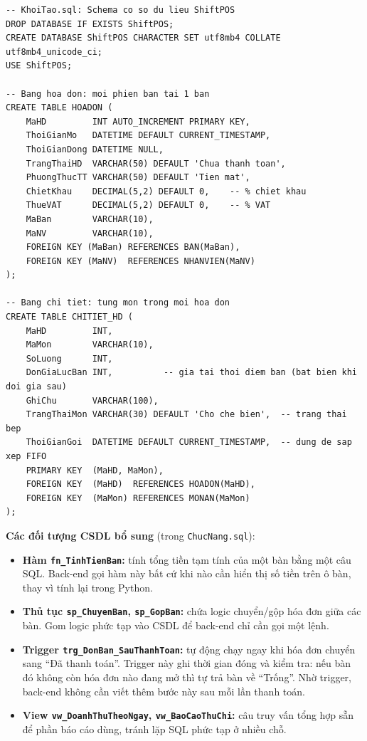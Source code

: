 \documentclass[12pt,a4paper]{report}
\newcommand{\code}[1]{\texttt{#1}}
\begin{document}
\begin{lstlisting}[style=mysql,
  caption={File \texttt{KhoiTao.sql} -- Định nghĩa bảng \texttt{HOADON} và \texttt{CHITIET\_HD}},
  label=lst:sql-tables]
-- KhoiTao.sql: Schema co so du lieu ShiftPOS
DROP DATABASE IF EXISTS ShiftPOS;
CREATE DATABASE ShiftPOS CHARACTER SET utf8mb4 COLLATE utf8mb4_unicode_ci;
USE ShiftPOS;

-- Bang hoa don: moi phien ban tai 1 ban
CREATE TABLE HOADON (
    MaHD         INT AUTO_INCREMENT PRIMARY KEY,
    ThoiGianMo   DATETIME DEFAULT CURRENT_TIMESTAMP,
    ThoiGianDong DATETIME NULL,
    TrangThaiHD  VARCHAR(50) DEFAULT 'Chua thanh toan',
    PhuongThucTT VARCHAR(50) DEFAULT 'Tien mat',
    ChietKhau    DECIMAL(5,2) DEFAULT 0,    -- % chiet khau
    ThueVAT      DECIMAL(5,2) DEFAULT 0,    -- % VAT
    MaBan        VARCHAR(10),
    MaNV         VARCHAR(10),
    FOREIGN KEY (MaBan) REFERENCES BAN(MaBan),
    FOREIGN KEY (MaNV)  REFERENCES NHANVIEN(MaNV)
);

-- Bang chi tiet: tung mon trong moi hoa don
CREATE TABLE CHITIET_HD (
    MaHD         INT,
    MaMon        VARCHAR(10),
    SoLuong      INT,
    DonGiaLucBan INT,          -- gia tai thoi diem ban (bat bien khi doi gia sau)
    GhiChu       VARCHAR(100),
    TrangThaiMon VARCHAR(30) DEFAULT 'Cho che bien',  -- trang thai bep
    ThoiGianGoi  DATETIME DEFAULT CURRENT_TIMESTAMP,  -- dung de sap xep FIFO
    PRIMARY KEY  (MaHD, MaMon),
    FOREIGN KEY  (MaHD)  REFERENCES HOADON(MaHD),
    FOREIGN KEY  (MaMon) REFERENCES MONAN(MaMon)
);
\end{lstlisting}

\textbf{Các đối tượng CSDL bổ sung} (trong \code{ChucNang.sql}):
\begin{itemize}
  \item \textbf{Hàm \code{fn\_TinhTienBan}:} tính tổng tiền tạm tính của một bàn bằng một câu SQL. Back-end gọi hàm này bất cứ khi nào cần hiển thị số tiền trên ô bàn, thay vì tính lại trong Python.
  \item \textbf{Thủ tục \code{sp\_ChuyenBan}, \code{sp\_GopBan}:} chứa logic chuyển/gộp hóa đơn giữa các bàn. Gom logic phức tạp vào CSDL để back-end chỉ cần gọi một lệnh.
  \item \textbf{Trigger \code{trg\_DonBan\_SauThanhToan}:} tự động chạy ngay khi hóa đơn chuyển sang ``Đã thanh toán''. Trigger này ghi thời gian đóng và kiểm tra: nếu bàn đó không còn hóa đơn nào đang mở thì tự trả bàn về ``Trống''. Nhờ trigger, back-end không cần viết thêm bước này sau mỗi lần thanh toán.
  \item \textbf{View \code{vw\_DoanhThuTheoNgay}, \code{vw\_BaoCaoThuChi}:} câu truy vấn tổng hợp sẵn để phần báo cáo dùng, tránh lặp SQL phức tạp ở nhiều chỗ.
\end{itemize}
\end{document}
